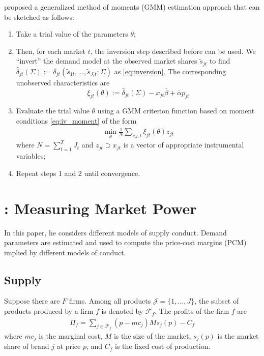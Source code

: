 \documentclass[11pt]{elegantbook}
\begin{document}
\cite{berry1995automobile} proposed a generalized method of moments (GMM) estimation approach that can be sketched as follows:
\begin{enumerate}
    \item Take a trial value of the parameters $\theta$;
    \item Then, for each market $t$, the inversion step described before can be used. We ``invert'' the demand model at the observed market shares $\tilde{s}_{jt}$ to find $\hat{\delta}_{jt}(\Sigma):=\delta_{jt}(\tilde{s}_{1t},...,\tilde{s}_{J_tt};\Sigma)$ as \eqref{eq:inversion}. The corresponding unobserved characteristics are $$\xi_{jt}(\theta):=\hat{\delta}_{jt}(\Sigma)-x_{jt}\bar{\beta}+\bar{\alpha}p_{jt}$$
    \item Evaluate the trial value $\theta$ using a GMM criterion function based on moment conditions \eqref{eq:iv_moment} of the form
    \begin{equation}
        \begin{aligned}
            \min_{\theta}\frac{1}{N}\sum_{\forall j,t}\xi_{jt}(\theta)z_{jt}
        \end{aligned}
        \nonumber
    \end{equation}
    where $N=\sum_{t=1}^T J_t$ and $z_{jt}\supset x_{jt}$ is a vector of  appropriate instrumental variables;
    \item Repeat steps 1 and 2 until convergence.
\end{enumerate}


\section{\cite{nevo2001measuring}: Measuring Market Power}
In this paper, he considers different models of supply conduct.  Demand parameters are estimated and used to compute the price-cost margins (PCM) implied by different models of conduct.

\subsection{Supply}
Suppose there are $F$ firms. Among all products $\mathcal{J}=\{1,...,J\}$, the subset of products produced by a firm $f$ is denoted by $\mathcal{F}_f$. The profits of the firm $f$ are
\begin{equation}
    \begin{aligned}
        \Pi_f=\sum_{j\in \mathcal{F}_f}(p-mc_j)Ms_j(p)-C_f
    \end{aligned}
    \nonumber
\end{equation}
where $mc_j$ is the marginal cost, $M$ is the size of the market, $s_j(p)$ is the market share of brand $j$ at price $p$, and $C_f$ is the fixed cost of production.
\end{document}
